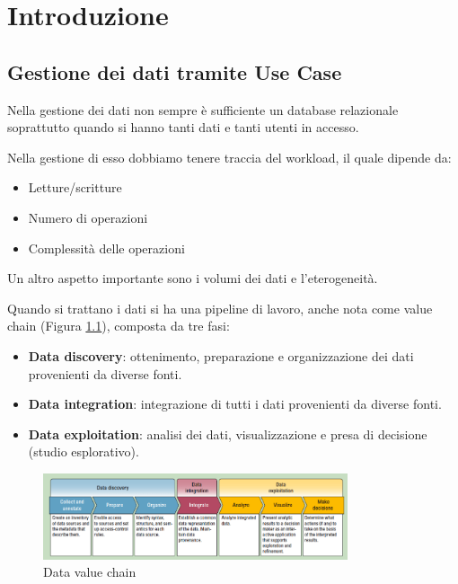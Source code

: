 \chapter{Introduzione}
\section{Gestione dei dati tramite Use Case}
Nella gestione dei dati non sempre è sufficiente un database relazionale soprattutto
quando si hanno tanti dati e tanti utenti in accesso.

Nella gestione di esso dobbiamo tenere traccia del workload, il quale dipende da:
\begin{itemize}
    \item Letture/scritture
    \item Numero di operazioni
    \item Complessità delle operazioni
\end{itemize}
Un altro aspetto importante sono i volumi dei dati e l'eterogeneità.

Quando si trattano i dati si ha una pipeline di lavoro, anche nota come value
chain (Figura \ref{fig:valChain}), composta da tre fasi:
\begin{itemize}
    \item \textbf{Data discovery}: ottenimento, preparazione e organizzazione
          dei dati provenienti da diverse fonti.
    \item \textbf{Data integration}: integrazione di tutti i dati provenienti da
          diverse fonti.
    \item \textbf{Data exploitation}: analisi dei dati, visualizzazione e presa
          di decisione (studio esplorativo).
\end{itemize}
\begin{figure}[ht]
    \centering
    \includegraphics[width=0.8\textwidth]{./img/data_chain.png}
    \caption{Data value chain}
    \label{fig:valChain}
\end{figure}

